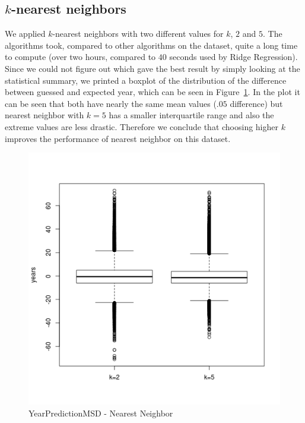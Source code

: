 \subsection{$k$-nearest neighbors}
We applied $k$-nearest neighbors with two different values for $k$, $2$ and $5$. The algorithms took, compared to other algorithms on the dataset, quite a long time to compute (over two hours, compared to $40$ seconds used by Ridge Regression). Since we could not figure out which gave the best result by simply looking at the statistical summary, we printed a boxplot of the distribution of the difference between guessed and expected year, which can be seen in Figure~\ref{ypmsd:fig:nnrresults}. In the plot it can be seen that both have nearly the same mean values ($.05$ difference) but nearest neighbor with $k=5$ has a smaller interquartile range and also the extreme values are less drastic. Therefore we conclude that choosing higher $k$ improves the performance of nearest neighbor on this dataset.
\begin{figure}[p]
	\center
	\includegraphics[scale=\figurescaling]{figures/ypmsd_nnr.png}
	\caption{YearPredictionMSD - Nearest Neighbor\label{ypmsd:fig:nnrresults}}
\end{figure}
